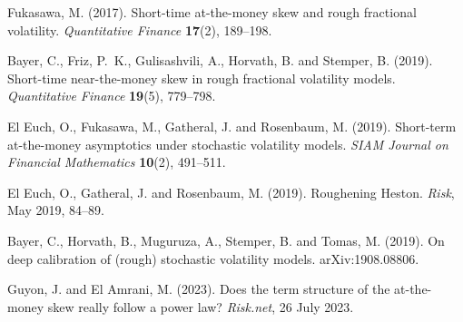  Fukasawa, M. (2017).
Short-time at-the-money skew and rough fractional volatility.
\emph{Quantitative Finance} \textbf{17}(2), 189--198.

 Bayer, C., Friz, P.~K., Gulisashvili, A., Horvath, B. and Stemper, B. (2019).
Short-time near-the-money skew in rough fractional volatility models.
\emph{Quantitative Finance} \textbf{19}(5), 779--798.

 El Euch, O., Fukasawa, M., Gatheral, J. and Rosenbaum, M. (2019).
Short-term at-the-money asymptotics under stochastic volatility models.
\emph{SIAM Journal on Financial Mathematics} \textbf{10}(2), 491--511.

 El Euch, O., Gatheral, J. and Rosenbaum, M. (2019).
Roughening Heston. \emph{Risk}, May 2019, 84--89.

 Bayer, C., Horvath, B., Muguruza, A., Stemper, B. and Tomas, M. (2019).
On deep calibration of (rough) stochastic volatility models. arXiv:1908.08806.

 Guyon, J. and El Amrani, M. (2023).
Does the term structure of the at-the-money skew really follow a power law?
\emph{Risk.net}, 26 July 2023.


